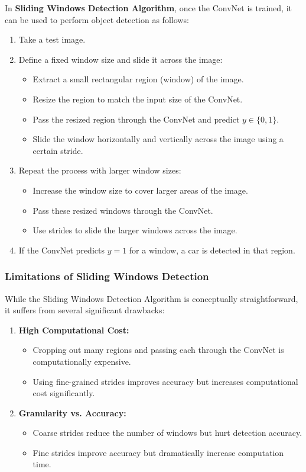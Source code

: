 \documentclass[letterpaper,12pt,notitlepage,twoside]{report}
\begin{document}
In \textbf{Sliding Windows Detection Algorithm}, once the ConvNet is trained, it can be used to perform object detection as follows:
\begin{enumerate}
    \item Take a test image.
    \item Define a fixed window size and slide it across the image:
    \begin{itemize}
        \item Extract a small rectangular region (window) of the image.
        \item Resize the region to match the input size of the ConvNet.
        \item Pass the resized region through the ConvNet and predict \(y \in \{0, 1\}\).
        \item Slide the window horizontally and vertically across the image using a certain stride.
    \end{itemize}
    \item Repeat the process with larger window sizes:
    \begin{itemize}
        \item Increase the window size to cover larger areas of the image.
        \item Pass these resized windows through the ConvNet.
        \item Use strides to slide the larger windows across the image.
    \end{itemize}
    \item If the ConvNet predicts \(y = 1\) for a window, a car is detected in that region.
\end{enumerate}

\subsubsection*{Limitations of Sliding Windows Detection}
While the Sliding Windows Detection Algorithm is conceptually straightforward, it suffers from several significant drawbacks:
\begin{enumerate}
    \item \textbf{High Computational Cost:}
    \begin{itemize}
        \item Cropping out many regions and passing each through the ConvNet is computationally expensive.
        \item Using fine-grained strides improves accuracy but increases computational cost significantly.
    \end{itemize}
    \item \textbf{Granularity vs. Accuracy:}
    \begin{itemize}
        \item Coarse strides reduce the number of windows but hurt detection accuracy.
        \item Fine strides improve accuracy but dramatically increase computation time.
    \end{itemize}
\end{enumerate}
\end{document}

